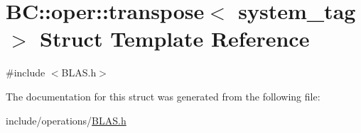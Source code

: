 \hypertarget{structBC_1_1oper_1_1transpose}{}\section{BC\+:\+:oper\+:\+:transpose$<$ system\+\_\+tag $>$ Struct Template Reference}
\label{structBC_1_1oper_1_1transpose}


{\ttfamily \#include $<$B\+L\+A\+S.\+h$>$}



The documentation for this struct was generated from the following file\+:\begin{DoxyCompactItemize}
\item 
include/operations/\hyperlink{operations_2BLAS_8h}{B\+L\+A\+S.\+h}\end{DoxyCompactItemize}
